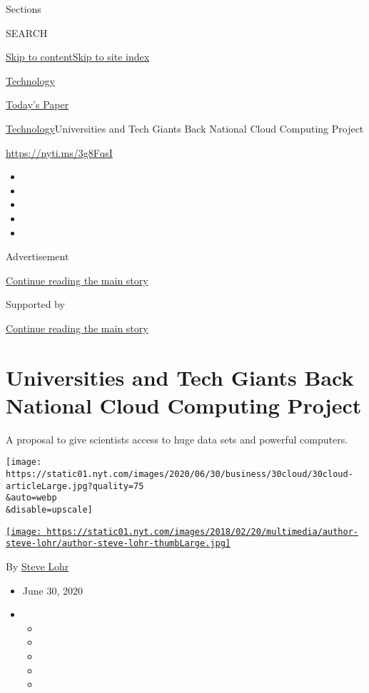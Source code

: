 Sections

SEARCH

\protect\hyperlink{site-content}{Skip to
content}\protect\hyperlink{site-index}{Skip to site index}

\href{https://www.nytimes.com/section/technology}{Technology}

\href{https://myaccount.nytimes.com/auth/login?response_type=cookie\&client_id=vi}{}

\href{https://www.nytimes.com/section/todayspaper}{Today's Paper}

\href{/section/technology}{Technology}\textbar{}Universities and Tech
Giants Back National Cloud Computing Project

\url{https://nyti.ms/3g8FqsI}

\begin{itemize}
\item
\item
\item
\item
\item
\end{itemize}

Advertisement

\protect\hyperlink{after-top}{Continue reading the main story}

Supported by

\protect\hyperlink{after-sponsor}{Continue reading the main story}

\hypertarget{universities-and-tech-giants-back-national-cloud-computing-project}{%
\section{Universities and Tech Giants Back National Cloud Computing
Project}\label{universities-and-tech-giants-back-national-cloud-computing-project}}

A proposal to give scientists access to huge data sets and powerful
computers.

\texttt{[image: https://static01.nyt.com/images/2020/06/30/business/30cloud/30cloud-articleLarge.jpg?quality=75\\\&auto=webp\\\&disable=upscale]}

\href{https://www.nytimes.com/by/steve-lohr}{\texttt{[image: https://static01.nyt.com/images/2018/02/20/multimedia/author-steve-lohr/author-steve-lohr-thumbLarge.jpg]}}

By \href{https://www.nytimes.com/by/steve-lohr}{Steve Lohr}

\begin{itemize}
\item
  June 30, 2020
\item
  \begin{itemize}
  \item
  \item
  \item
  \item
  \item
  \end{itemize}
\end{itemize}

